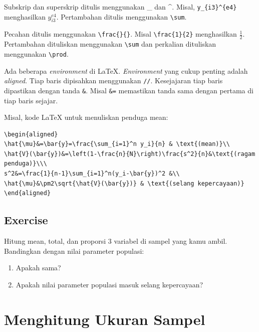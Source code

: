 \documentclass[
  letterpaper,
  DIV=11,
  numbers=noendperiod]{scrreprt}
\providecommand{\tightlist}{%
  \setlength{\itemsep}{0pt}\setlength{\parskip}{0pt}}\usepackage{longtable,booktabs,array}
\begin{document}
Subskrip dan superskrip ditulis menggunakan \_ dan \^{}. Misal,
\texttt{y\_\{i3\}\^{}\{e4\}} menghasilkan \(y_{i3}^{e4}\). Pertambahan
ditulis menggunakan \texttt{\textbackslash{}sum}.

Pecahan ditulis menggunakan \texttt{\textbackslash{}frac\{\}\{\}}. Misal
\texttt{\textbackslash{}frac\{1\}\{2\}} menghasilkan \(\frac{1}{2}\).
Pertambahan dituliskan menggunakan \texttt{\textbackslash{}sum} dan
perkalian dituliskan menggunakan \texttt{\textbackslash{}prod}.

Ada beberapa \emph{environment} di LaTeX. \emph{Environment} yang cukup
penting adalah \emph{aligned}. Tiap baris dipisahkan menggunakan
\texttt{//}. Kesejajaran tiap baris dipastikan dengan tanda \texttt{\&}.
Misal \texttt{\&=} memastikan tanda sama dengan pertama di tiap baris
sejajar.

Misal, kode LaTeX untuk menuliskan penduga mean:

\begin{verbatim}
\begin{aligned}
\hat{\mu}&=\bar{y}=\frac{\sum_{i=1}^n y_i}{n} & \text{(mean)}\\
\hat{V}(\bar{y})&=\left(1-\frac{n}{N}\right)\frac{s^2}{n}&\text{(ragam penduga)}\\\
s^2&=\frac{1}{n-1}\sum_{i=1}^n(y_i-\bar{y})^2 &\\
\hat{\mu}&\pm2\sqrt{\hat{V}(\bar{y})} & \text{(selang kepercayaan)}
\end{aligned}
\end{verbatim}

\hypertarget{exercise-3}{%
\subsection{Exercise}\label{exercise-3}}

Hitung mean, total, dan proporsi 3 variabel di sampel yang kamu ambil.
Bandingkan dengan nilai parameter populasi:

\begin{enumerate}
\def\labelenumi{\arabic{enumi}.}
\tightlist
\item
  Apakah sama?
\item
  Apakah nilai parameter populasi masuk selang kepercayaan?
\end{enumerate}

\hypertarget{menghitung-ukuran-sampel}{%
\section{Menghitung Ukuran Sampel}\label{menghitung-ukuran-sampel}}
\end{document}
